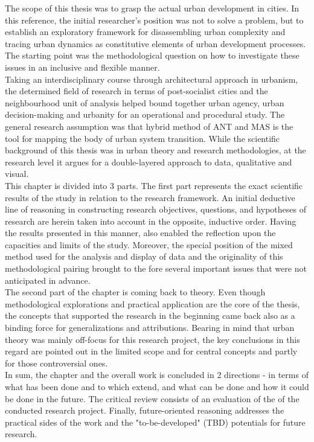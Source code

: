 \documentclass[11pt]{report}
\begin{document}

The scope of this thesis was to grasp the actual urban development  in cities.
In this reference, the initial researcher's position was not to solve a problem, but to establish an exploratory framework for disassembling urban complexity and tracing urban dynamics as constitutive elements of urban development processes.
The starting point was the methodological question on how to investigate these issues in an inclusive and flexible manner.
\\
Taking an interdisciplinary course through architectural approach in urbanism, the determined field of research in terms of post-socialist cities and the neighbourhood unit of analysis helped bound together urban agency, urban decision-making and urbanity for an operational and procedural study.
The general research assumption was that hybrid method of ANT and MAS
is the tool for mapping the body of urban system transition.
While the scientific background of this thesis was in urban theory and research methodologies, at the research level it argues for a double-layered approach to data, qualitative and visual.  
\\
This chapter is divided into 3 parts. 
The first part represents the exact scientific results of the study in relation to the research framework.
An initial deductive line of reasoning in constructing research objectives, questions, and hypotheses of research are herein taken into account in the opposite, inductive order.
Having the results presented in this manner, also enabled the reflection upon the capacities and limits of the study.
Moreover, the special position of the mixed method used for the analysis and display of data and the originality of this methodological pairing brought to the fore several important issues that were not anticipated in advance.
\\
The second part of the chapter is coming back to theory.
Even though methodological explorations and practical application are the core of the thesis, the concepts that supported the research in the beginning came back also as a binding force for generalizations and attributions.
Bearing in mind that urban theory was mainly off-focus for this research project, the key conclusions in this regard are pointed out in the limited scope and for central concepts and partly for those controversial ones.
\\
In sum, the chapter and the overall work is concluded in 2 directions - in terms of what has been done and to which extend, and what can be done and how it could be done in the future.
The critical review consists of an evaluation of the of the conducted research project.
Finally, future-oriented reasoning addresses the practical sides of the work and the "to-be-developed" (TBD) potentials for future research.
\end{document}
